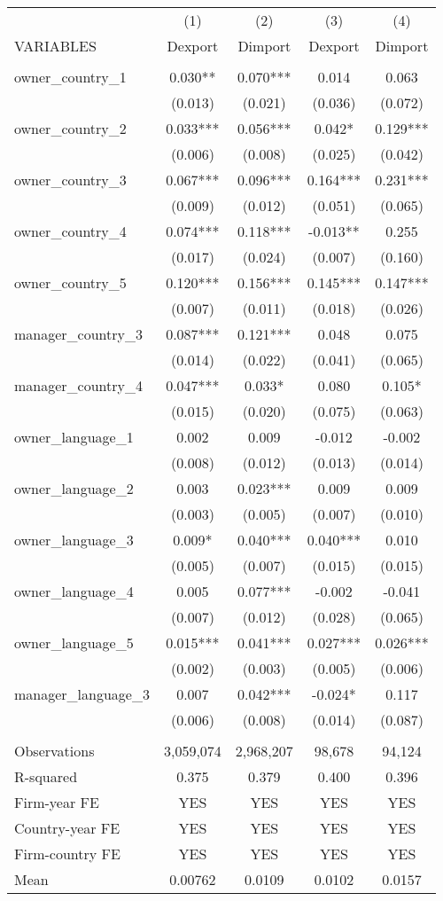 \begin{tabular}{lcccc} \hline
 & (1) & (2) & (3) & (4) \\
VARIABLES & Dexport & Dimport & Dexport & Dimport \\ \hline
 &  &  &  &  \\
owner\_country\_1 & 0.030** & 0.070*** & 0.014 & 0.063 \\
 & (0.013) & (0.021) & (0.036) & (0.072) \\
owner\_country\_2 & 0.033*** & 0.056*** & 0.042* & 0.129*** \\
 & (0.006) & (0.008) & (0.025) & (0.042) \\
owner\_country\_3 & 0.067*** & 0.096*** & 0.164*** & 0.231*** \\
 & (0.009) & (0.012) & (0.051) & (0.065) \\
owner\_country\_4 & 0.074*** & 0.118*** & -0.013** & 0.255 \\
 & (0.017) & (0.024) & (0.007) & (0.160) \\
owner\_country\_5 & 0.120*** & 0.156*** & 0.145*** & 0.147*** \\
 & (0.007) & (0.011) & (0.018) & (0.026) \\
manager\_country\_3 & 0.087*** & 0.121*** & 0.048 & 0.075 \\
 & (0.014) & (0.022) & (0.041) & (0.065) \\
manager\_country\_4 & 0.047*** & 0.033* & 0.080 & 0.105* \\
 & (0.015) & (0.020) & (0.075) & (0.063) \\
owner\_language\_1 & 0.002 & 0.009 & -0.012 & -0.002 \\
 & (0.008) & (0.012) & (0.013) & (0.014) \\
owner\_language\_2 & 0.003 & 0.023*** & 0.009 & 0.009 \\
 & (0.003) & (0.005) & (0.007) & (0.010) \\
owner\_language\_3 & 0.009* & 0.040*** & 0.040*** & 0.010 \\
 & (0.005) & (0.007) & (0.015) & (0.015) \\
owner\_language\_4 & 0.005 & 0.077*** & -0.002 & -0.041 \\
 & (0.007) & (0.012) & (0.028) & (0.065) \\
owner\_language\_5 & 0.015*** & 0.041*** & 0.027*** & 0.026*** \\
 & (0.002) & (0.003) & (0.005) & (0.006) \\
manager\_language\_3 & 0.007 & 0.042*** & -0.024* & 0.117 \\
 & (0.006) & (0.008) & (0.014) & (0.087) \\
 &  &  &  &  \\
Observations & 3,059,074 & 2,968,207 & 98,678 & 94,124 \\
R-squared & 0.375 & 0.379 & 0.400 & 0.396 \\
Firm-year FE & YES & YES & YES & YES \\
Country-year FE & YES & YES & YES & YES \\
Firm-country FE & YES & YES & YES & YES \\
 Mean & 0.00762 & 0.0109 & 0.0102 & 0.0157 \\ \hline
\end{tabular}
